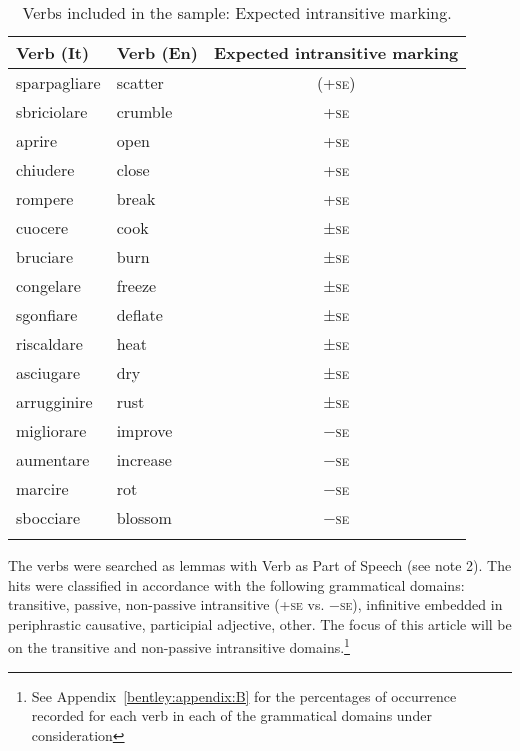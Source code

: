 \documentclass[output=paper,colorlinks,citecolor=brown
]{langscibook}
\begin{document}
\begin{table}
\caption{Verbs included in the sample: Expected intransitive marking.}
\label{tab:bentley_table_1}
\begin{tabular}{llc}
  \lsptoprule
  Verb (It)  & Verb (En) & Expected intransitive marking \\
  \midrule
sparpagliare & 	scatter	& (+\textsc{se}) \\
sbriciolare &	crumble	& +\textsc{se} \\
aprire 	& open	& +\textsc{se} \\
chiudere &	close	& +\textsc{se} \\
rompere &	break	& +\textsc{se} \\
cuocere &	cook	& ±\textsc{se} \\
bruciare &	burn	& ±\textsc{se} \\
congelare &	freeze	& ±\textsc{se} \\
sgonfiare &	deflate	& ±\textsc{se} \\
riscaldare &	heat	& ±\textsc{se} \\
asciugare &	dry	& ±\textsc{se} \\
arrugginire &	rust	& ±\textsc{se} \\
migliorare &	improve	& −\textsc{se} \\
aumentare &	increase	& −\textsc{se} \\
marcire	& rot	& −\textsc{se} \\
sbocciare &	blossom	& −\textsc{se} \\
\lspbottomrule
\end{tabular}
\end{table}

The verbs were searched as lemmas with Verb as Part of Speech (see note 2). The hits were classified in accordance with the following grammatical domains: transitive, passive, non-passive intransitive (+\textsc{se} vs. −\textsc{se}), infinitive embedded in periphrastic causative, participial adjective, other. The focus of this article will be on the transitive and non-passive intransitive domains.\footnote{See Appendix~\ref{bentley:appendix:B} for the percentages of occurrence recorded for each verb in each of the grammatical domains under consideration}
\end{document}
